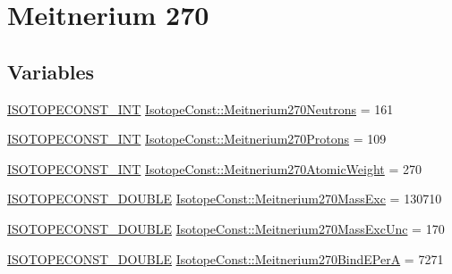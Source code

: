 \hypertarget{group___isotope_const-_meitnerium-_mt270}{}\section{Meitnerium 270}
\label{group___isotope_const-_meitnerium-_mt270}
\subsection*{Variables}
\begin{DoxyCompactItemize}
\item 
\mbox{\hyperlink{group___isotope_const-_macros_ga5f18360b3e99483a35c32d789e62621c}{I\+S\+O\+T\+O\+P\+E\+C\+O\+N\+S\+T\+\_\+\+I\+NT}} \mbox{\hyperlink{group___isotope_const-_meitnerium-_mt270_ga389e44d39d48c30d020beac4f255a04b}{Isotope\+Const\+::\+Meitnerium270\+Neutrons}} = 161
\item 
\mbox{\hyperlink{group___isotope_const-_macros_ga5f18360b3e99483a35c32d789e62621c}{I\+S\+O\+T\+O\+P\+E\+C\+O\+N\+S\+T\+\_\+\+I\+NT}} \mbox{\hyperlink{group___isotope_const-_meitnerium-_mt270_gad1546a40495d0a67e01c106671cd1610}{Isotope\+Const\+::\+Meitnerium270\+Protons}} = 109
\item 
\mbox{\hyperlink{group___isotope_const-_macros_ga5f18360b3e99483a35c32d789e62621c}{I\+S\+O\+T\+O\+P\+E\+C\+O\+N\+S\+T\+\_\+\+I\+NT}} \mbox{\hyperlink{group___isotope_const-_meitnerium-_mt270_ga891b261bf8420c5a92dcd90ed9d96e06}{Isotope\+Const\+::\+Meitnerium270\+Atomic\+Weight}} = 270
\item 
\mbox{\hyperlink{group___isotope_const-_macros_ga8f45a7272ce02c0b4c65c44636ed719a}{I\+S\+O\+T\+O\+P\+E\+C\+O\+N\+S\+T\+\_\+\+D\+O\+U\+B\+LE}} \mbox{\hyperlink{group___isotope_const-_meitnerium-_mt270_ga44ef530ab6d96c36d93bf0155431017a}{Isotope\+Const\+::\+Meitnerium270\+Mass\+Exc}} = 130710
\item 
\mbox{\hyperlink{group___isotope_const-_macros_ga8f45a7272ce02c0b4c65c44636ed719a}{I\+S\+O\+T\+O\+P\+E\+C\+O\+N\+S\+T\+\_\+\+D\+O\+U\+B\+LE}} \mbox{\hyperlink{group___isotope_const-_meitnerium-_mt270_ga587ce8861d2258bd8fe3417800ad6f35}{Isotope\+Const\+::\+Meitnerium270\+Mass\+Exc\+Unc}} = 170
\item 
\mbox{\hyperlink{group___isotope_const-_macros_ga8f45a7272ce02c0b4c65c44636ed719a}{I\+S\+O\+T\+O\+P\+E\+C\+O\+N\+S\+T\+\_\+\+D\+O\+U\+B\+LE}} \mbox{\hyperlink{group___isotope_const-_meitnerium-_mt270_gae2f5ac1313985aa0eb3b9eb6f4ffef88}{Isotope\+Const\+::\+Meitnerium270\+Bind\+E\+PerA}} = 7271
\item 

\end{DoxyCompactItemize}
